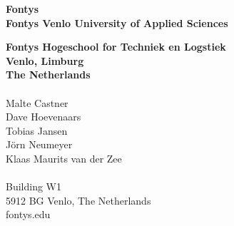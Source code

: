 \thispagestyle{empty} %
\vspace*{\fill}
\sffamily

\Large{
\noindent
\textbf{Fontys}\\
\textbf{Fontys Venlo University of Applied Sciences}\\
}

\small
\noindent
\textbf{Fontys Hogeschool for Techniek en Logstiek}\\
\textbf{Venlo, Limburg}\\
\textbf{The Netherlands}\\
\\
Malte Castner\\
Dave Hoevenaars\\
Tobias Jansen\\
Jörn Neumeyer\\
Klaas Maurits van der Zee\\\\
Building W1\\
5912 BG Venlo, The Netherlands\\
fontys.edu\\
\normalsize
\normalfont
\vspace*{2.5cm}
